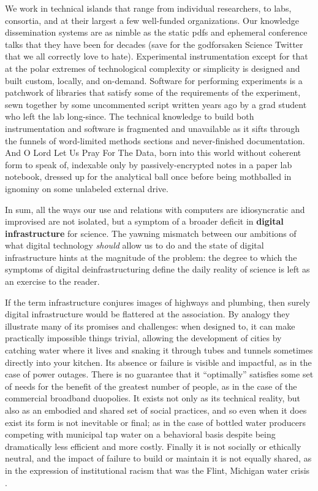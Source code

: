 \documentclass[10pt]{article}
\begin{document}
\begin{multicols}{2}
 We work in technical islands that range from individual
researchers, to labs, consortia, and at their largest a few well-funded
organizations. Our knowledge dissemination systems are as nimble as the
static pdfs and ephemeral conference talks that they have been for
decades (save for the godforsaken Science Twitter that we all correctly
love to hate). Experimental instrumentation except for that at the polar
extremes of technological complexity or simplicity is designed and built
custom, locally, and on-demand. Software for performing experiments is a
patchwork of libraries that satisfy some of the requirements of the
experiment, sewn together by some uncommented script written years ago
by a grad student who left the lab long-since. The technical knowledge
to build both instrumentation and software is fragmented and unavailable
as it sifts through the funnels of word-limited methods sections and
never-finished documentation. And O Lord Let Us Pray For The Data, born
into this world without coherent form to speak of, indexable only by
passively-encrypted notes in a paper lab notebook, dressed up for the
analytical ball once before being mothballed in ignominy on some
unlabeled external drive.

In sum, all the ways our use and relations with computers are
idiosyncratic and improvised are not isolated, but a symptom of a
broader deficit in \textbf{digital infrastructure} for science. The
yawning mismatch between our ambitions of what digital technology
\emph{should} allow us to do and the state of digital infrastructure
hints at the magnitude of the problem: the degree to which the symptoms
of digital deinfrastructuring define the daily reality of science is
left as an exercise to the reader.

If the term infrastructure conjures images of highways and plumbing,
then surely digital infrastructure would be flattered at the
association. By analogy they illustrate many of its promises and
challenges: when designed to, it can make practically impossible things
trivial, allowing the development of cities by catching water where it
lives and snaking it through tubes and tunnels sometimes directly into
your kitchen. Its absence or failure is visible and impactful, as in the
case of power outages. There is no guarantee that it ``optimally''
satisfies some set of needs for the benefit of the greatest number of
people, as in the case of the commercial broadband duopolies. It exists
not only as its technical reality, but also as an embodied and shared
set of social practices, and so even when it does exist its form is not
inevitable or final; as in the case of bottled water producers competing
with municipal tap water on a behavioral basis despite being
dramatically less efficient and more costly. Finally it is not socially
or ethically neutral, and the impact of failure to build or maintain it
is not equally shared, as in the expression of institutional racism that
was the Flint, Michigan water crisis \cite{michicancivilrightscommissionFlintWaterCrisis2017} .


\end{multicols}
\end{document}
